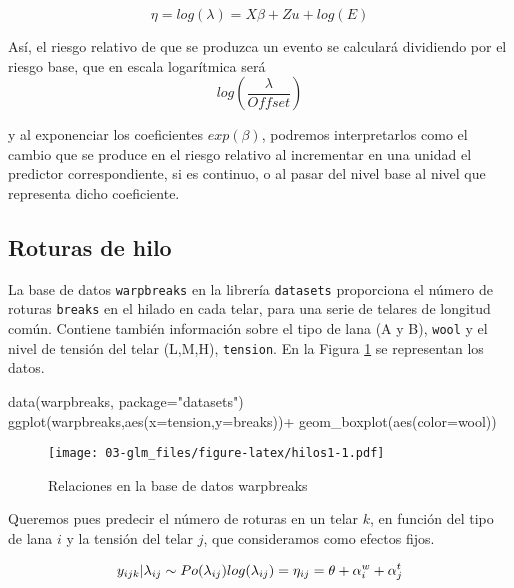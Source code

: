 \documentclass[
]{book}
\newenvironment{Shaded}{\begin{snugshade}}{\end{snugshade}}
\newcommand{\AttributeTok}[1]{\textcolor[rgb]{0.77,0.63,0.00}{#1}}
\newcommand{\FunctionTok}[1]{\textcolor[rgb]{0.00,0.00,0.00}{#1}}
\newcommand{\NormalTok}[1]{#1}
\newcommand{\SpecialCharTok}[1]{\textcolor[rgb]{0.00,0.00,0.00}{#1}}
\newcommand{\StringTok}[1]{\textcolor[rgb]{0.31,0.60,0.02}{#1}}
\begin{document}
\[\eta=log(\lambda)=X\beta+Zu+log(E)\]

Así, el riesgo relativo de que se produzca un evento se calculará dividiendo por el riesgo base, que en escala logarítmica será
\[log\left(\frac{\lambda}{Offset}\right)\]

y al exponenciar los coeficientes \(exp(\beta)\), podremos interpretarlos como el cambio que se produce en el riesgo relativo al incrementar en una unidad el predictor correspondiente, si es continuo, o al pasar del nivel base al nivel que representa dicho coeficiente.

\hypertarget{roturas-de-hilo}{%
\subsection{Roturas de hilo}\label{roturas-de-hilo}}

La base de datos \texttt{warpbreaks} en la librería \texttt{datasets} proporciona el número de roturas \texttt{breaks} en el hilado en cada telar, para una serie de telares de longitud común. Contiene también información sobre el tipo de lana (A y B), \texttt{wool} y el nivel de tensión del telar (L,M,H), \texttt{tension}. En la Figura \ref{fig:hilos1} se representan los datos.

\begin{Shaded}
\begin{Highlighting}[]
\FunctionTok{data}\NormalTok{(warpbreaks, }\AttributeTok{package=}\StringTok{"datasets"}\NormalTok{)}
\FunctionTok{ggplot}\NormalTok{(warpbreaks,}\FunctionTok{aes}\NormalTok{(}\AttributeTok{x=}\NormalTok{tension,}\AttributeTok{y=}\NormalTok{breaks))}\SpecialCharTok{+}
  \FunctionTok{geom\_boxplot}\NormalTok{(}\FunctionTok{aes}\NormalTok{(}\AttributeTok{color=}\NormalTok{wool))}
\end{Highlighting}
\end{Shaded}

\begin{figure}
\centering
\texttt{[image: 03-glm\_files/figure-latex/hilos1-1.pdf]}
\caption{\label{fig:hilos1}Relaciones en la base de datos warpbreaks}
\end{figure}

Queremos pues predecir el número de roturas en un telar \(k\), en función del tipo de lana \(i\) y la tensión del telar \(j\), que consideramos como efectos fijos.

\[ y_{ijk}|\lambda_{ij} \sim Po(\lambda_{ij}) \\
log(\lambda_{ij})=\eta_{ij}=\theta+ \alpha_i^w+ \alpha_j^t\]
\end{document}
